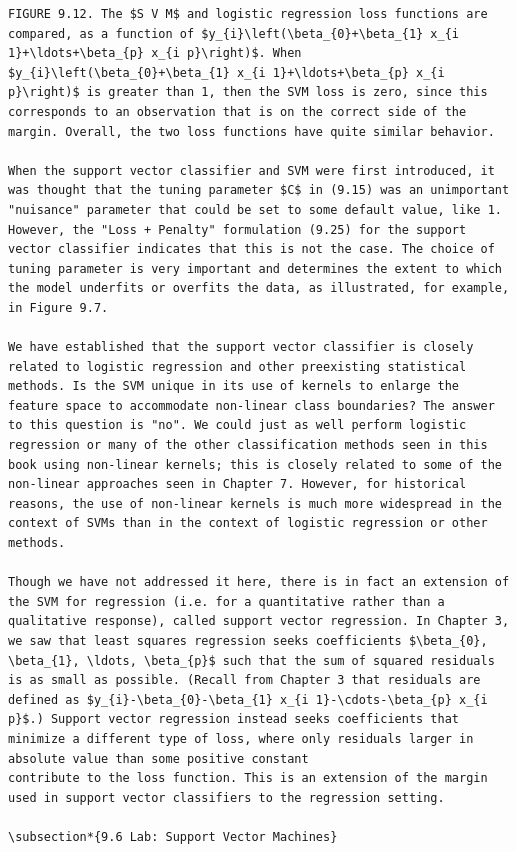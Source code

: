 \documentclass[10pt]{article}
\begin{document}
\begin{verbatim}
FIGURE 9.12. The $S V M$ and logistic regression loss functions are compared, as a function of $y_{i}\left(\beta_{0}+\beta_{1} x_{i 1}+\ldots+\beta_{p} x_{i p}\right)$. When $y_{i}\left(\beta_{0}+\beta_{1} x_{i 1}+\ldots+\beta_{p} x_{i p}\right)$ is greater than 1, then the SVM loss is zero, since this corresponds to an observation that is on the correct side of the margin. Overall, the two loss functions have quite similar behavior.

When the support vector classifier and SVM were first introduced, it was thought that the tuning parameter $C$ in (9.15) was an unimportant "nuisance" parameter that could be set to some default value, like 1. However, the "Loss + Penalty" formulation (9.25) for the support vector classifier indicates that this is not the case. The choice of tuning parameter is very important and determines the extent to which the model underfits or overfits the data, as illustrated, for example, in Figure 9.7.

We have established that the support vector classifier is closely related to logistic regression and other preexisting statistical methods. Is the SVM unique in its use of kernels to enlarge the feature space to accommodate non-linear class boundaries? The answer to this question is "no". We could just as well perform logistic regression or many of the other classification methods seen in this book using non-linear kernels; this is closely related to some of the non-linear approaches seen in Chapter 7. However, for historical reasons, the use of non-linear kernels is much more widespread in the context of SVMs than in the context of logistic regression or other methods.

Though we have not addressed it here, there is in fact an extension of the SVM for regression (i.e. for a quantitative rather than a qualitative response), called support vector regression. In Chapter 3, we saw that least squares regression seeks coefficients $\beta_{0}, \beta_{1}, \ldots, \beta_{p}$ such that the sum of squared residuals is as small as possible. (Recall from Chapter 3 that residuals are defined as $y_{i}-\beta_{0}-\beta_{1} x_{i 1}-\cdots-\beta_{p} x_{i p}$.) Support vector regression instead seeks coefficients that minimize a different type of loss, where only residuals larger in absolute value than some positive constant
contribute to the loss function. This is an extension of the margin used in support vector classifiers to the regression setting.

\subsection*{9.6 Lab: Support Vector Machines}


\end{verbatim}
\end{document}
